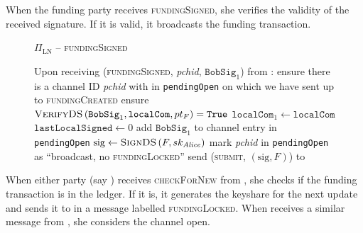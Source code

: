   When the funding party receives \textsc{fundingSigned}, she verifies the
  validity of the received signature. If it is valid, it broadcasts the funding
  transaction.

  \begin{figure}[H]
    \begin{protocolbox}{$\Pi_{\mathrm{LN}}$ -- \textsc{fundingSigned}}
      \begin{algorithmic}[1]
        \State Upon receiving (\textsc{fundingSigned}, \textit{pchid},
        $\mathtt{BobSig}_1$) from \bob:
        \Indent
          \State ensure there is a channel ID \textit{pchid} with \bob{} in
          \texttt{pendingOpen} on which we have sent up to
          \textsc{fundingCreated}
          \State ensure $\textsc{VerifyDS}\left(\mathtt{BobSig}_1,
          \mathtt{localCom}, pt_F\right) = \mathtt{True}$
          \State $\mathtt{localCom}_1 \gets \mathtt{localCom}$
          \State $\mathtt{lastLocalSigned} \gets 0$
          \State add $\mathtt{BobSig}_1$ to channel entry in
          \texttt{pendingOpen}
          \State $\mathrm{sig} \gets \textsc{SignDS}\left(F,
          sk_{\mathit{Alice}}\right)$
          \State mark \textit{pchid} in \texttt{pendingOpen} as ``broadcast, no
          \textsc{fundingLocked}''
          \label{alg:protocol:open:fundingSigned:mark}
          \State send (\textsc{submit}, $\left(\mathrm{sig}, F\right)$) to
          \ledger
        \EndIndent
      \end{algorithmic}
    \end{protocolbox}
    \caption{}
    \label{alg:protocol:open:fundingSigned}
  \end{figure}

  When either party (say \alice) receives \textsc{checkForNew} from
  \environment, she checks if the funding transaction is in the ledger. If it
  is, it generates the keyshare for the next update and sends it to \bob{} in a
  message labelled \textsc{fundingLocked}. When \alice{} receives a similar
  message from \bob, she considers the channel open.

